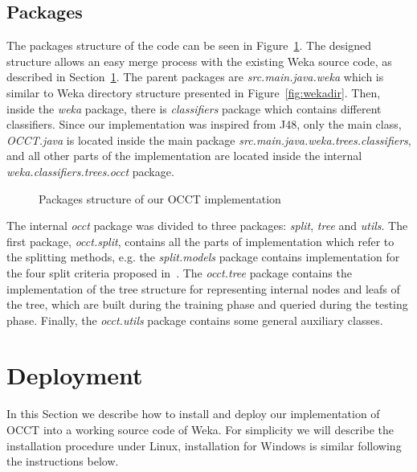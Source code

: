\documentclass[a4paper,12pt]{article}
\begin{document}
\begin{spacing}{1.5}
\pagebreak

\subsection{Packages}
The packages structure of the code can be seen in Figure~\ref{fig:packages}. The designed structure allows an easy merge process with the existing Weka source code, as described in Section~\ref{sec:deployment}. The parent packages are {\em src.main.java.weka} which is similar to Weka directory structure presented in Figure~\ref{fig:wekadir}. Then, inside the {\em weka} package, there is {\em classifiers} package which contains different classifiers. Since our implementation was inspired from J48, only the main class, {\em OCCT.java} is located inside the main package {\em src.main.java.weka.trees.classifiers}, and all other parts of the implementation are located inside the internal {\em weka.classifiers.trees.occt} package.
\begin{figure}[!h]
    \caption{Packages structure of our OCCT implementation}
    \label{fig:packages}
\end{figure}

The internal {\em occt} package was divided to three packages: {\em split}, {\em tree} and {\em utils}. The first package, {\em occt.split}, contains all the parts of implementation which refer to the splitting methods, e.g. the {\em split.models} package contains implementation for the four split criteria proposed in~\cite{dror2011thesis,dror2014occt}. The {\em occt.tree} package contains the implementation of the tree structure for representing internal nodes and leafs of the tree, which are built during the training phase and queried during the testing phase. Finally, the {\em occt.utils} package contains some general auxiliary classes.
\pagebreak
\section{Deployment}\label{sec:deployment}
In this Section we describe how to install and deploy our implementation of OCCT into a working source code of Weka. For simplicity we will describe the installation procedure under Linux, installation for Windows is similar following the instructions below.


\end{spacing}
\end{document}
